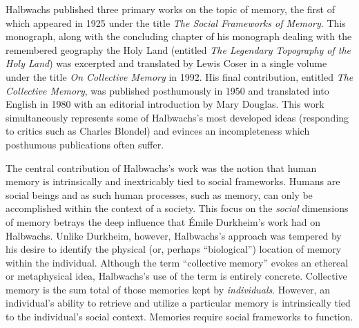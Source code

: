 Halbwachs published three primary works on the topic of memory, the
first of which appeared in 1925 under the title
\emph{The Social Frameworks of Memory}.\autocite{halbwachs1925} This
monograph, along with the concluding chapter of his monograph dealing
with the remembered geography the Holy Land (entitled
\emph{The Legendary Topography of the Holy Land}) was excerpted and
translated by Lewis Coser in a single volume under the title \emph{On
Collective Memory} in 1992.\autocites[Several of the most important
chapters of \emph{Social Frameworks} were included in full. Likewise,
the entirety of the conclusion of
\emph{Legendary Topography of the Holy Land} was
included][]{halbwachs1992}{halbwachs1941} His final contribution,
entitled \emph{The Collective Memory}, was published posthumously in
1950 and translated into English in 1980 with an editorial introduction
by Mary Douglas.\autocite{halbwachs1980} This work simultaneously
represents some of Halbwachs's most developed ideas (responding to
critics such as Charles Blondel) and evinces an incompleteness which
posthumous publications often suffer.\autocites{halbwachs1980}[As Coser
observes, ``One may doubt that the author himself would have been
willing to publish it in what seems to be an unfinished state. The book
nevertheless contains many further developments of Halbwachs's thought
in regard to such matters as the relation of space and time to
collective memory as well as fruitful definitions and applications of
the differences between individual, collective, and historical
memory.''][2]{coser_halbwachs1992}

The central contribution of Halbwachs's work was the notion that human
memory is intrinsically and inextricably tied to social frameworks.
Humans are social beings and as such human processes, such as memory,
can only be accomplished within the context of a society. This focus on
the \emph{social} dimensions of memory betrays the deep influence that
Émile Durkheim's work had on Halbwachs. Unlike Durkheim, however,
Halbwachs's approach was tempered by his desire to identify the physical
(or, perhaps ``biological'') location of memory within the individual.
Although the term ``collective memory'' evokes an ethereal or
metaphysical idea, Halbwachs's use of the term is entirely concrete.
Collective memory is the sum total of those memories kept by
\emph{individuals}. However, an individual's ability to retrieve and
utilize a particular memory is intrinsically tied to the individual's
social context. Memories require social frameworks to
function.\autocite[38]{halbwachs1992}

